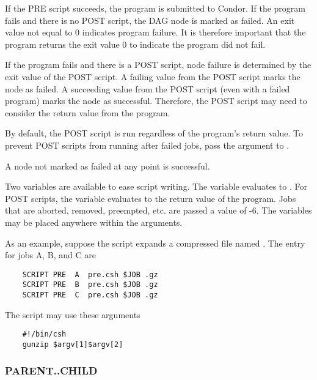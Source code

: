 If the PRE script succeeds, the program is submitted to Condor. 
If the program fails and there is no POST script,
the DAG node is marked as failed.
An exit value not equal to 0 indicates program failure.
It is therefore important that the program returns the exit
value 0 to indicate the program did not fail.

If the program fails and there is a POST script,
node failure is determined by the exit value of the POST script.
A failing value from the POST script marks the node as failed.
A succeeding value from the POST script (even with a failed
program) marks the node as successful.
Therefore, the POST script may need to consider the return
value from the program.

By default, the POST script is run regardless of the program's
return value.  To prevent POST scripts from running after failed jobs,
pass the  argument to .

A node not marked as failed at any point is successful.

Two variables are available to ease script writing.
The  variable evaluates to .
For POST scripts, the  variable evaluates to the return value of the program.
Jobs that are aborted, removed, preempted, etc. are passed a 
value of -6.
The variables may be
placed anywhere within the arguments.

As an example, suppose the  script expands a compressed file named
.
The  entry for jobs A, B, and C are

\footnotesize
\begin{verbatim}
    SCRIPT PRE  A  pre.csh $JOB .gz
    SCRIPT PRE  B  pre.csh $JOB .gz
    SCRIPT PRE  C  pre.csh $JOB .gz
\end{verbatim}
\normalsize

The script  may use these arguments

\begin{verbatim}
    #!/bin/csh
    gunzip $argv[1]$argv[2]
\end{verbatim}


\subsubsection{\label{dagman:ParentChild}PARENT..CHILD}

